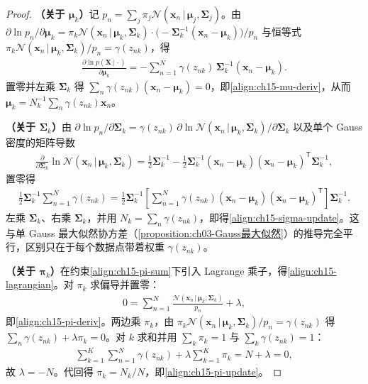 \documentclass[../../main.tex]{subfiles}
\begin{document}
\begin{proof}
\textbf{（关于 $\bm{\mu}_k$）}记 $p_n=\sum_j\pi_j\mathcal{N}(\bm{x}_n\,|\,\bm{\mu}_j,\bm{\Sigma}_j)$。由 $\partial\ln p_n/\partial\bm{\mu}_k=\pi_k\mathcal{N}(\bm{x}_n\,|\,\bm{\mu}_k,\bm{\Sigma}_k)\cdot\big(-\bm{\Sigma}_k^{-1}(\bm{x}_n-\bm{\mu}_k)\big)/p_n$ 与恒等式 $\pi_k\mathcal{N}(\bm{x}_n\,|\,\bm{\mu}_k,\bm{\Sigma}_k)/p_n=\gamma(z_{nk})$，得
\begin{align*}
\frac{\partial\ln p(\bm{X}\,|\,\cdot)}{\partial\bm{\mu}_k}
=-\sum_{n=1}^{N}\gamma(z_{nk})\,\bm{\Sigma}_k^{-1}(\bm{x}_n-\bm{\mu}_k).
\end{align*}
置零并左乘 $\bm{\Sigma}_k$ 得 $\sum_n\gamma(z_{nk})(\bm{x}_n-\bm{\mu}_k)=0$，即\eqref{align:ch15-mu-deriv}，从而 $\bm{\mu}_k=N_k^{-1}\sum_n\gamma(z_{nk})\bm{x}_n$。

\textbf{（关于 $\bm{\Sigma}_k$）}由 $\partial\ln p_n/\partial\bm{\Sigma}_k=\gamma(z_{nk})\,\partial\ln\mathcal{N}(\bm{x}_n\,|\,\bm{\mu}_k,\bm{\Sigma}_k)/\partial\bm{\Sigma}_k$ 以及单个 Gauss 密度的矩阵导数
\begin{align*}
\frac{\partial}{\partial\bm{\Sigma}_k}\ln\mathcal{N}(\bm{x}_n\,|\,\bm{\mu}_k,\bm{\Sigma}_k)
=\frac{1}{2}\bm{\Sigma}_k^{-1}-\frac{1}{2}\bm{\Sigma}_k^{-1}(\bm{x}_n-\bm{\mu}_k)(\bm{x}_n-\bm{\mu}_k)^{\mathsf T}\bm{\Sigma}_k^{-1},
\end{align*}
置零得
\begin{align*}
\frac{1}{2}\bm{\Sigma}_k^{-1}\sum_{n=1}^{N}\gamma(z_{nk})
=\frac{1}{2}\bm{\Sigma}_k^{-1}\left[\sum_{n=1}^{N}\gamma(z_{nk})(\bm{x}_n-\bm{\mu}_k)(\bm{x}_n-\bm{\mu}_k)^{\mathsf T}\right]\bm{\Sigma}_k^{-1}.
\end{align*}
左乘 $\bm{\Sigma}_k$、右乘 $\bm{\Sigma}_k$，并用 $N_k=\sum_n\gamma(z_{nk})$，即得\eqref{align:ch15-sigma-update}。这与单 Gauss 最大似然协方差（\cref{proposition:ch03-Gauss最大似然}）的推导完全平行，区别只在于每个数据点带着权重 $\gamma(z_{nk})$。

\textbf{（关于 $\bm{\pi}_k$）}在约束\eqref{align:ch15-pi-sum}下引入 Lagrange 乘子，得\eqref{align:ch15-lagrangian}。对 $\pi_k$ 求偏导并置零：
\begin{align*}
0=\sum_{n=1}^{N}\frac{\mathcal{N}(\bm{x}_n\,|\,\bm{\mu}_k,\bm{\Sigma}_k)}{p_n}+\lambda,
\end{align*}
即\eqref{align:ch15-pi-deriv}。两边乘 $\pi_k$，由 $\pi_k\mathcal{N}(\bm{x}_n\,|\,\bm{\mu}_k,\bm{\Sigma}_k)/p_n=\gamma(z_{nk})$ 得 $\sum_n\gamma(z_{nk})+\lambda\pi_k=0$。对 $k$ 求和并用 $\sum_k\pi_k=1$ 与 $\sum_k\gamma(z_{nk})=1$：
\begin{align*}
\sum_{k=1}^{K}\sum_{n=1}^{N}\gamma(z_{nk})+\lambda\sum_{k=1}^{K}\pi_k=N+\lambda=0,
\end{align*}
故 $\lambda=-N$。代回得 $\pi_k=N_k/N$，即\eqref{align:ch15-pi-update}。
\end{proof}
\end{document}
